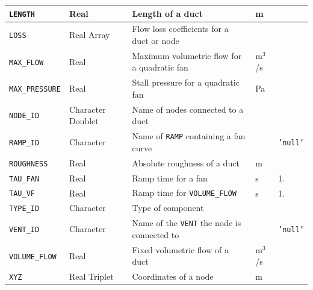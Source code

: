 \documentclass[11pt]{book}
\newcommand{\ct}{\tt\small}
\begin{document}
\begin{longtable}{@{\extracolsep{\fill}}|l|l|l|l|l|}
{\ct LENGTH}                    & Real              & Length of a duct                                  &  m            &                       \\ \hline
{\ct LOSS}                      & Real Array        & Flow loss coefficients for a duct or node         &               &                       \\ \hline
{\ct MAX\_FLOW}                 & Real              & Maximum volumetric flow for a quadratic fan       &  m$^3$/s      &                       \\ \hline
{\ct MAX\_PRESSURE}             & Real              & Stall pressure for a quadratic fan                &  Pa           &                       \\ \hline
{\ct NODE\_ID}                  & Character Doublet & Name of nodes connected to a duct                 &               &                       \\ \hline
{\ct RAMP\_ID}                  & Character         & Name of {\ct RAMP} containing a fan curve         &               &  {\ct 'null'}         \\ \hline
{\ct ROUGHNESS}                 & Real              & Absolute roughness of a duct                      &  m            &                       \\ \hline
{\ct TAU\_FAN}                  & Real              & Ramp time for a fan                               & s             & 1.                      \\ \hline
{\ct TAU\_VF}                   & Real              & Ramp time for {\ct VOLUME\_FLOW}                  & s             & 1.                      \\ \hline
{\ct TYPE\_ID}                  & Character         & Type of component                                 &               &                       \\ \hline
{\ct VENT\_ID}                  & Character         & Name of the {\ct VENT} the node is connected to   &               &  {\ct 'null'}         \\ \hline
{\ct VOLUME\_FLOW}              & Real              & Fixed volumetric flow of a duct                   &  m$^3$/s      &                       \\ \hline
{\ct XYZ}                       & Real Triplet      & Coordinates of a node                             &  m            &                       \\ \hline
\end{longtable}
\end{document}
